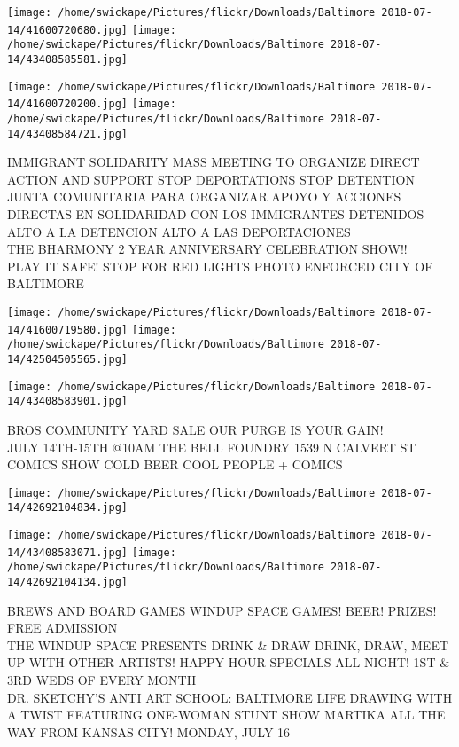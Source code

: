 \documentclass[10pt,letterpaper]{article}
\begin{document}
\texttt{[image: /home/swickape/Pictures/flickr/Downloads/Baltimore 2018-07-14/41600720680.jpg]}
\texttt{[image: /home/swickape/Pictures/flickr/Downloads/Baltimore 2018-07-14/43408585581.jpg]}

\texttt{[image: /home/swickape/Pictures/flickr/Downloads/Baltimore 2018-07-14/41600720200.jpg]}
\texttt{[image: /home/swickape/Pictures/flickr/Downloads/Baltimore 2018-07-14/43408584721.jpg]}

IMMIGRANT SOLIDARITY MASS MEETING TO ORGANIZE DIRECT ACTION AND SUPPORT STOP DEPORTATIONS STOP DETENTION\\
JUNTA COMUNITARIA PARA ORGANIZAR APOYO Y ACCIONES DIRECTAS EN SOLIDARIDAD CON LOS IMMIGRANTES DETENIDOS ALTO A LA DETENCION ALTO A LAS DEPORTACIONES\\
THE BHARMONY 2 YEAR ANNIVERSARY CELEBRATION SHOW!!\\
PLAY IT SAFE!  STOP FOR RED LIGHTS PHOTO ENFORCED CITY OF BALTIMORE
\pagebreak

\texttt{[image: /home/swickape/Pictures/flickr/Downloads/Baltimore 2018-07-14/41600719580.jpg]}
\texttt{[image: /home/swickape/Pictures/flickr/Downloads/Baltimore 2018-07-14/42504505565.jpg]}

\texttt{[image: /home/swickape/Pictures/flickr/Downloads/Baltimore 2018-07-14/43408583901.jpg]}

BROS COMMUNITY YARD SALE OUR PURGE IS YOUR GAIN!\\
JULY 14TH{-}15TH @10AM THE BELL FOUNDRY 1539 N CALVERT ST\\
COMICS SHOW COLD BEER COOL PEOPLE + COMICS
\pagebreak

\texttt{[image: /home/swickape/Pictures/flickr/Downloads/Baltimore 2018-07-14/42692104834.jpg]}

\vspace{0.25in}
\texttt{[image: /home/swickape/Pictures/flickr/Downloads/Baltimore 2018-07-14/43408583071.jpg]}
\texttt{[image: /home/swickape/Pictures/flickr/Downloads/Baltimore 2018-07-14/42692104134.jpg]}

BREWS AND BOARD GAMES WINDUP SPACE GAMES!  BEER!  PRIZES!  FREE ADMISSION\\
THE WINDUP SPACE PRESENTS DRINK \& DRAW DRINK, DRAW, MEET UP WITH OTHER ARTISTS!  HAPPY HOUR SPECIALS ALL NIGHT!  1ST \& 3RD WEDS OF EVERY MONTH\\
DR. SKETCHY'S ANTI ART SCHOOL: BALTIMORE LIFE DRAWING WITH A TWIST FEATURING ONE{-}WOMAN STUNT SHOW MARTIKA ALL THE WAY FROM KANSAS CITY! MONDAY, JULY 16
\pagebreak
\end{document}
